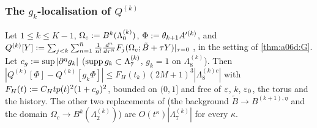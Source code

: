 \subsubsection*{The $g_k$-localisation of $Q^{(k)}$ \cite[p.~579]{Ba2}}

\begin{proposition}\label{prop:a06f:H}
Let $1\le k\le K-1$, $\Omega_c:= B^k(\Lambda^{(k)}_0)$, $\Phi:=\theta_{k+1}A'^{(k)}$, and $Q^{(k)}[Y]:=\sum_{j<k}\sum_{n=1}^{\bar n}\frac1{n!}\frac{d^n}{d\tau^n}F_j(\Omega_c;\tilde B+\tau Y)|_{\tau=0}$ \cite[(2.105)--(2.106)]{Ba2}, in the setting of \cref{thm:a06d:G}. Let $c_g:=\sup|\partial^\eta g_k|$ ($\operatorname{supp} g_k\subset\Lambda^{(k)}_7$, $g_k=1$ on $\Lambda^{(k)}_8$). Then $|Q^{(k)}[\Phi]-Q^{(k)}[g_k\Phi]|\le F_H(t_k)(2M+1)^3|\Lambda^{(k)c}_8|$ with $F_H(t):= C_Htp(t)^2(1+c_g)^2$, bounded on $(0,1]$ and free of $\varepsilon$, $k$, $\varepsilon_0$, the torus and the history. The other two replacements of \cite[(2.107)]{Ba2} (the background $\tilde B\to B^{(k+1),\eta}$ and the domain $\Omega_c\to B^k(\Lambda^{(k)}_2)$) are $O(t^\kappa)|\Lambda^{(k)}_7|$ for every $\kappa$.
\end{proposition}

